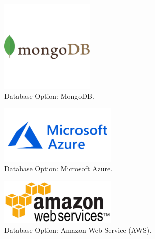 \begin{figure}[h!]
	\caption{Database Option: MongoDB.}
	\label{image:mongodb}
	\centering
	\includegraphics[width=0.4\textwidth]{images/mongodb.png}
\end{figure}

\newpage

\begin{figure}[h!]
	\caption{Database Option: Microsoft Azure.}
	\label{image:azure}
	\centering
	\includegraphics[width=0.5\textwidth]{images/azure.png}
\end{figure}

\begin{figure}[h!]
	\caption{Database Option: Amazon Web Service (AWS).}
	\label{image:aws}
	\centering
	\includegraphics[width=0.5\textwidth]{images/aws.png}
\end{figure}
\newpage

